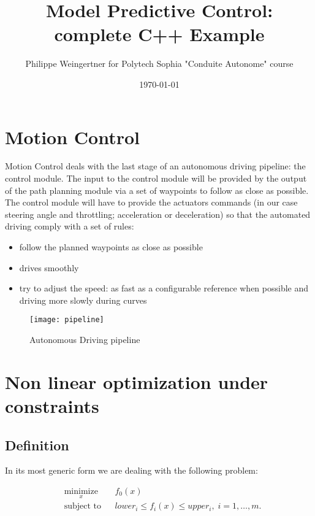 \documentclass[11pt]{article}
\begin{document}
\title{Model Predictive Control: complete C++ Example}
\author{Philippe Weingertner for Polytech Sophia "Conduite Autonome" course}
\date{\today}
\maketitle

\tableofcontents

\section{Motion Control}

Motion Control deals with the last stage of an autonomous driving pipeline: the control module.
The input to the control module will be provided by the output of the path planning module via a set of waypoints to follow as close as possible.
The control module will have to provide the actuators commands (in our case steering angle and throttling; acceleration or deceleration) so that the automated driving comply with a set of rules:


\begin{itemize}
\item follow the planned waypoints as close as possible
\item drives smoothly
\item try to adjust the speed: as fast as a configurable reference when possible and driving more slowly during curves
\end{itemize}



\begin{figure}[h]
    \centering
    \texttt{[image: pipeline]}
    \caption{Autonomous Driving pipeline}
    \label{fig:pipeline}
\end{figure}

\section{Non linear optimization under constraints}

\subsection{Definition}

In its most generic form we are dealing with the following problem:

\begin{equation*}
\begin{aligned}
& \underset{x}{\text{minimize}}
& & f_0(x) \\
& \text{subject to}
& & lower_i \leq f_i(x) \leq upper_i, \; i = 1, \ldots, m.
\end{aligned}
\end{equation*}
\end{document}
